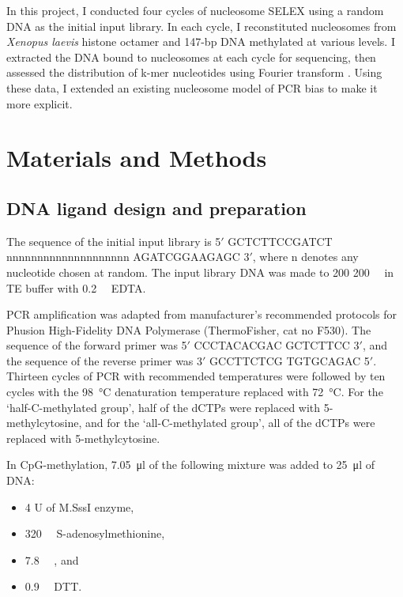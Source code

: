 \documentclass[parskip=full, numbers=noenddot]{scrreprt}
\begin{document}

In this project, I conducted four cycles of nucleosome SELEX using a random DNA as the initial input library.  In each cycle, I reconstituted nucleosomes from \emph{Xenopus laevis} histone octamer and 147-bp DNA \citep{dyer_reconstitution_2003} methylated at various levels.  I extracted the DNA bound to nucleosomes at each cycle for sequencing, then assessed the distribution of k-mer nucleotides using Fourier transform \citep{lowary_new_1998, zhu_interaction_2018}.  Using these data, I extended an existing nucleosome model of PCR bias to make it more explicit.

\section{Materials and Methods}
\label{sec:emsaselex_methods}

\subsection{DNA ligand design and preparation}
\label{ssec:emsaselex_methods_lig}

The sequence of the initial input library is 5$'$ GCTCTTCCGATCT nnnnnnnnnnnnnnnnnnnn AGATCGGAAGAGC 3$'$, where n denotes any nucleotide chosen at random. The input library DNA was made to 200 \SI{200}{\nano\Molar} in TE buffer with \SI{0.2}{\milli\Molar} EDTA.

PCR amplification was adapted from manufacturer's recommended protocols for Phusion High-Fidelity DNA Polymerase (ThermoFisher, cat no F530).  The sequence of the forward primer was 5$'$ CCCTACACGAC GCTCTTCC 3$'$, and the sequence of the reverse primer was 3$'$ GCCTTCTCG TGTGCAGAC 5$'$.  Thirteen cycles of PCR with recommended temperatures were followed by ten cycles with the \SI{98}{\celsius} denaturation temperature replaced with \SI{72}{\celsius}.  For the `half-C-methylated group', half of the dCTPs were replaced with 5-methylcytosine, and for the `all-C-methylated group', all of the dCTPs were replaced with 5-methylcytosine.

In CpG-methylation, \SI{7.05}{\micro\litre} of the following mixture was added to \SI{25}{\micro\litre} of DNA:

\begin{itemize}
\item 4 U of M.SssI enzyme,
\item \SI{320}{\micro\Molar} S-adenosylmethionine,
\item \SI{7.8}{\milli\Molar} , and
\item \SI{0.9}{\milli\Molar} DTT.
\end{itemize}
\label{recipe:cpgmix}
\end{document}
